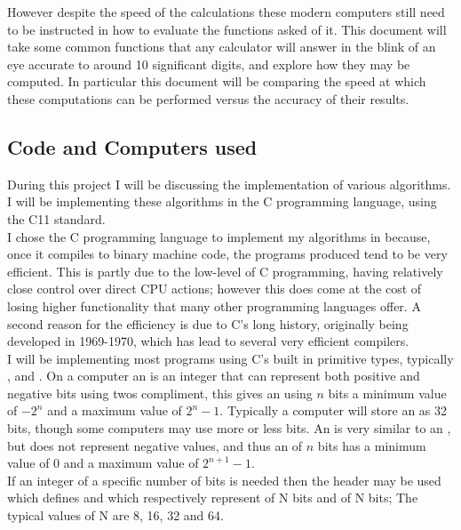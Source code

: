 However despite the speed of the calculations these modern computers still need to be instructed in how to evaluate the functions asked of it. This document will take some common functions that any calculator will answer in the blink of an eye accurate to around 10 significant digits, and explore how they may be computed. In particular this document will be comparing the speed at which these computations can be performed versus the accuracy of their results.\\

\subsection{Code and Computers used}
\label{SUB_"Code and Computers used}
During this project I will be discussing the implementation of various algorithms. I will be implementing these algorithms in the C programming language, using the C11 standard.\\

I chose the C programming language to implement my algorithms in because, once it compiles to binary machine code, the programs produced tend to be very efficient. This is partly due to the low-level of C programming, having relatively close control over direct CPU actions; however this does come at the cost of losing higher functionality that many other programming languages offer. A second reason for the efficiency is due to C's long history, originally being developed in 1969-1970, which has lead to several very efficient compilers.\\

I will be implementing most programs using C's built in primitive types, typically ,  and . On a computer an  is an integer that can represent both positive and negative bits using twos compliment, this gives an  using \(n\) bits a minimum value of \(-2^n\) and a maximum value of \(2^n-1\). Typically a computer will store an  as 32 bits, though some computers may use more or less bits. An  is very similar to an , but does not represent negative values, and thus an  of \(n\) bits has a minimum value of \(0\) and a maximum value of \(2^{n+1}-1\).\\

If an integer of a specific number of bits is needed then the header  may be used which defines  and  which respectively represent  of N bits and  of N bits; The typical values of N are 8, 16, 32 and 64.\\


